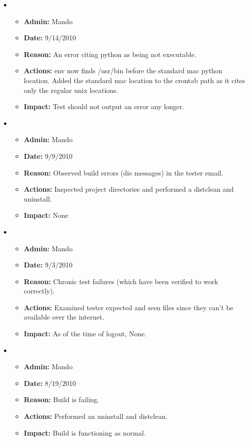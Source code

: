 \documentclass[12pt]{article}
\begin{document}
\begin{itemize}
\item 
\begin{itemize}
\item[] {\bf Admin:} Mando
\item[] {\bf Date:} 9/14/2010
\item[] {\bf Reason:} An error citing python as being not executable. 
\item[] {\bf Actions:} env now finds /usr/bin before the standard mac python location. Added the standard mac location to the crontab path as it cites only the regular unix locations.
\item[] {\bf Impact:} Test should not output an error any longer.
\end{itemize}
	
\item 
\begin{itemize}
\item[] {\bf Admin:} Mando
\item[] {\bf Date:} 9/9/2010
\item[] {\bf Reason:} Observed build errors (die messages) in the tester email. 
\item[] {\bf Actions:} Inspected project directories and performed a distclean and uninstall.
\item[] {\bf Impact:} None
\end{itemize}

\item 
\begin{itemize}
\item[] {\bf Admin:} Mando
\item[] {\bf Date:} 9/3/2010
\item[] {\bf Reason:} Chronic test failures (which have been verified to work correctly). 
\item[] {\bf Actions:} Examined tester expected and seen files since they can't be available over the internet.
\item[] {\bf Impact:} As of the time of logout, None.
\end{itemize}
	
\item 
\begin{itemize}
\item[] {\bf Admin:} Mando
\item[] {\bf Date:} 8/19/2010
\item[] {\bf Reason:} Build is failing. 
\item[] {\bf Actions:} Performed an uninstall and distclean.
\item[] {\bf Impact:} Build is functioning as normal.
\end{itemize}
	

\end{itemize}
\end{document}
